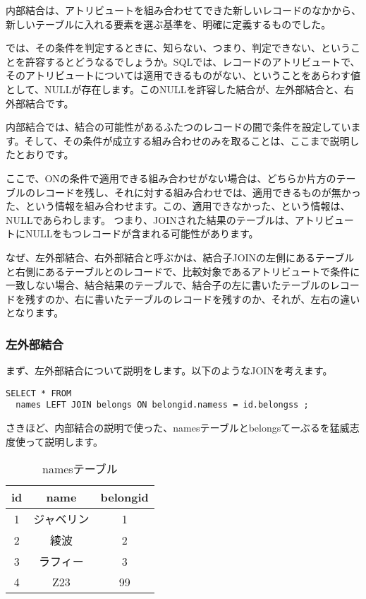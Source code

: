 内部結合は、アトリビュートを組み合わせてできた新しいレコードのなかから、新しいテーブルに入れる要素を選ぶ基準を、明確に定義するものでした。

では、その条件を判定するときに、知らない、つまり、判定できない、ということを許容するとどうなるでしょうか。SQLでは、レコードのアトリビュートで、そのアトリビュートについては適用できるものがない、ということをあらわす値として、NULLが存在します。このNULLを許容した結合が、左外部結合と、右外部結合です。

内部結合では、結合の可能性があるふたつのレコードの間で条件を設定しています。そして、その条件が成立する組み合わせのみを取ることは、ここまで説明したとおりです。

ここで、ONの条件で適用できる組み合わせがない場合は、どちらか片方のテーブルのレコードを残し、それに対する組み合わせでは、適用できるものが無かった、という情報を組み合わせます。この、適用できなかった、という情報は、NULLであらわします。
つまり、JOINされた結果のテーブルは、アトリビュートにNULLをもつレコードが含まれる可能性があります。

なぜ、左外部結合、右外部結合と呼ぶかは、結合子JOINの左側にあるテーブルと右側にあるテーブルとのレコードで、比較対象であるアトリビュートで条件に一致しない場合、結合結果のテーブルで、結合子の左に書いたテーブルのレコードを残すのか、右に書いたテーブルのレコードを残すのか、それが、左右の違いとなります。

\subsubsection{左外部結合}

まず、左外部結合について説明をします。以下のようなJOINを考えます。

\begin{verbatim}
SELECT * FROM
  names LEFT JOIN belongs ON belongid.namess = id.belongss ;
\end{verbatim}

さきほど、内部結合の説明で使った、namesテーブルとbelongsてーぶるを猛威志度使って説明します。

\begin{table}[htb]
  \begin{tabular}{|c|c|c|} \hline
    id & name & belongid \\ \hline
    1 & ジャベリン & 1 \\
    2 & 綾波 & 2 \\
    3 & ラフィー & 3 \\
    4 & Z23 & 99 \\ \hline
  \end{tabular}
　　\label{table:names_left}
　　\caption{namesテーブル}
\end{table}

